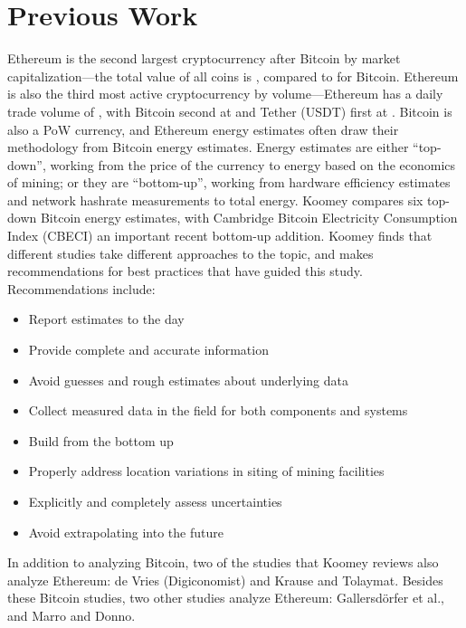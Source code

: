 \section{Previous Work}

Ethereum is the second largest cryptocurrency after Bitcoin by market capitalization---the total value of all coins is , compared to  for Bitcoin. Ethereum is also the third most active cryptocurrency by volume---Ethereum has a daily trade volume of , with Bitcoin second at  and Tether (USDT) first at .\cite{coinmarketcap_cryptocurrency_2021} Bitcoin is also a PoW currency, and Ethereum energy estimates often draw their methodology from Bitcoin energy estimates. Energy estimates are either ``top-down'', working from the price of the currency to energy based on the economics of mining; or they are ``bottom-up'', working from hardware efficiency estimates and network hashrate measurements to total energy. Koomey\cite{koomey_estimating_2019} compares six top-down Bitcoin energy estimates, with Cambridge Bitcoin Electricity Consumption Index (CBECI)\cite{cambridge_centre_for_alternative_finance_cambridge_2021} an important recent bottom-up addition. Koomey finds that different studies take different approaches to the topic, and makes recommendations for best practices that have guided this study. Recommendations include:

\begin{itemize}
    \item Report estimates to the day
    \item Provide complete and accurate information
    \item Avoid guesses and rough estimates about underlying data
    \item Collect measured data in the field for both components and systems
    \item Build from the bottom up
    \item Properly address location variations in siting of mining facilities
    \item Explicitly and completely assess uncertainties
    \item Avoid extrapolating into the future
\end{itemize}

In addition to analyzing Bitcoin, two of the studies that Koomey reviews also analyze Ethereum: de Vries\cite{de_vries_ethereum_2021} (Digiconomist) and Krause and Tolaymat\cite{krause_quantification_2018}. Besides these Bitcoin studies, two other studies analyze Ethereum: Gallersdörfer et al.\cite{gallersdorfer_energy_2020}, and Marro and Donno\cite{marro_greennftgreen_2021}.

